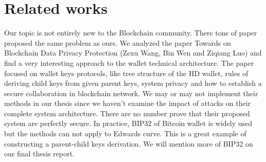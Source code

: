 \chapter{Related works}\label{chap: Related works}
Our topic is not entirely new to the Blockchain community.
There tons of paper proposed the same problem as ours.
We analyzed the paper Towards on Blockchain Data Privacy Protection (Zexu Wang, Bin Wen and Ziqiang Luo) and find a very interesting approach to the wallet technical architecture. 
The paper focused on wallet keys protocols, like tree structure of the HD wallet, rules of deriving child keys from given parent keys, system privacy and how to establish a secure collaboration in blockchain network.
We may or may not implement their methods in our thesis since we haven't examine the impact of attacks on their complete system architecture. There are no number prove that their proposed system are perfectly secure.
In practice, BIP32 of Bitcoin wallet is widely used but the methods can not apply to Edwards curve. 
This is a great example of constructing a parent-child keys derivation. We will mention more of BIP32 on our final thesis report. 
